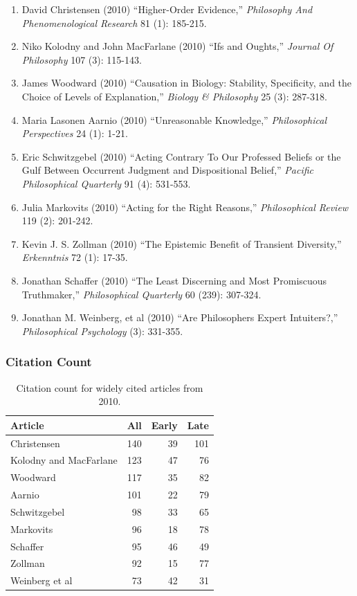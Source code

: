 \documentclass[
  10pt,
  letterpaper,
  DIV=11,
  numbers=noendperiod,
  twoside]{scrartcl}
\providecommand{\tightlist}{%
  \setlength{\itemsep}{0pt}\setlength{\parskip}{0pt}}\usepackage{longtable,booktabs,array}
\begin{document}
\begin{enumerate}
\def\labelenumi{\arabic{enumi}.}
\tightlist
\item
  David Christensen (2010) ``Higher-Order Evidence,'' \emph{Philosophy
  And Phenomenological Research} 81 (1): 185-215.
\item
  Niko Kolodny and John MacFarlane (2010) ``Ifs and Oughts,''
  \emph{Journal Of Philosophy} 107 (3): 115-143.
\item
  James Woodward (2010) ``Causation in Biology: Stability, Specificity,
  and the Choice of Levels of Explanation,'' \emph{Biology \&
  Philosophy} 25 (3): 287-318.
\item
  Maria Lasonen Aarnio (2010) ``Unreasonable Knowledge,''
  \emph{Philosophical Perspectives} 24 (1): 1-21.
\item
  Eric Schwitzgebel (2010) ``Acting Contrary To Our Professed Beliefs or
  the Gulf Between Occurrent Judgment and Dispositional Belief,''
  \emph{Pacific Philosophical Quarterly} 91 (4): 531-553.
\item
  Julia Markovits (2010) ``Acting for the Right Reasons,''
  \emph{Philosophical Review} 119 (2): 201-242.
\item
  Kevin J. S. Zollman (2010) ``The Epistemic Benefit of Transient
  Diversity,'' \emph{Erkenntnis} 72 (1): 17-35.
\item
  Jonathan Schaffer (2010) ``The Least Discerning and Most Promiscuous
  Truthmaker,'' \emph{Philosophical Quarterly} 60 (239): 307-324.
\item
  Jonathan M. Weinberg, et al (2010) ``Are Philosophers Expert
  Intuiters?,'' \emph{Philosophical Psychology} (3): 331-355.
\end{enumerate}

\subsubsection*{Citation Count}\label{sec-count-2010}

\begin{longtable}[]{@{}lrrr@{}}

\caption{\label{tbl-citation-count-2010}Citation count for widely cited
articles from 2010.}

\tabularnewline

\toprule\noalign{}
Article & All & Early & Late \\
\midrule\noalign{}
\endhead
\bottomrule\noalign{}
\endlastfoot
Christensen & 140 & 39 & 101 \\
Kolodny and MacFarlane & 123 & 47 & 76 \\
Woodward & 117 & 35 & 82 \\
Aarnio & 101 & 22 & 79 \\
Schwitzgebel & 98 & 33 & 65 \\
Markovits & 96 & 18 & 78 \\
Schaffer & 95 & 46 & 49 \\
Zollman & 92 & 15 & 77 \\
Weinberg et al & 73 & 42 & 31 \\

\end{longtable}
\end{document}
